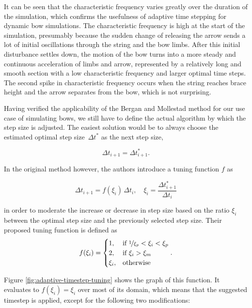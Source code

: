 It can be seen that the characteristic frequency varies greatly over the duration of the simulation, which confirms the usefulness of adaptive time stepping for dynamic bow simulations.
The characteristic frequency is high at the start of the simulation, presumably because the sudden change of releasing the arrow sends a lot of initial oscillations through the string and the bow limbs.
After this initial disturbance settles down, the motion of the bow turns into a more steady and continuous acceleration of limbs and arrow, represented by a relatively long and smooth section with a low characteristic frequency and larger optimal time steps.
The second spike in characteristic frequency occurs when the string reaches brace height and the arrow separates from the bow, which is not surprising.

Having verified the applicability of the Bergan and Mollestad method for our use case of simulating bows, we still have to define the actual algorithm by which the step size is adjusted.
The easiest solution would be to always choose the estimated optimal step size~$\Delta t^*$ as the next step size,

\begin{equation}
\Delta t_{i+1} = \Delta t^*_{i+1}.
\end{equation}

In the original method however, the authors introduce a tuning function $f$ as

\begin{equation}
\Delta t_{i+1} = f(\xi_{i})\,\Delta t_{i}, \quad \xi_{i} = \frac{\Delta t^*_{i+1}}{\Delta t_{i}}
\end{equation}

in order to moderate the increase or decrease in step size based on the ratio $\xi_{i}$ between the optimal step size and the previously selected step size.
Their proposed tuning function is defined as
%
\begin{align}
f(\xi_{i}) = \begin{cases}
1, & \text{if $\nicefrac{1}{\xi_{p}} < \xi_{i} < \xi_{p}$} \\
2, & \text{if $\xi_{i} > \xi_{m}$} \\
\xi_{i}, & \text{otherwise}
\end{cases}.
\end{align}

Figure \ref{fig:adaptive-timestep-tuning} shows the graph of this function.
It evaluates to $f(\xi_{i}) = \xi_{i}$ over most of its domain, which means that the suggested timestep is applied, except for the following two modifications:


